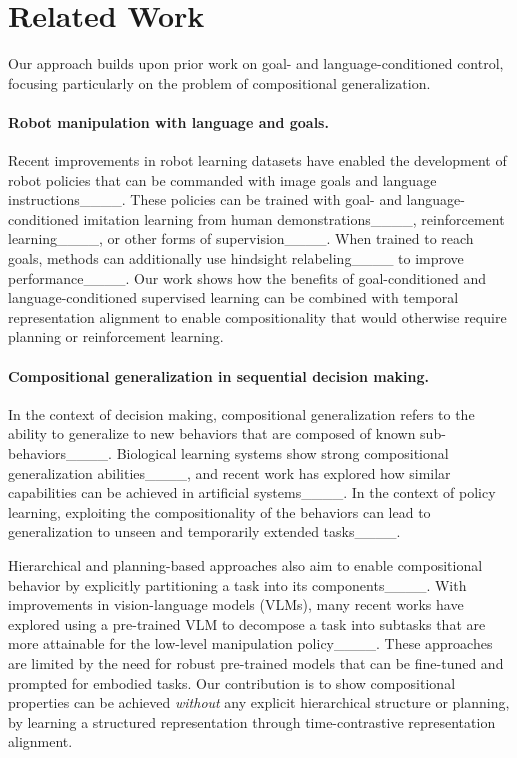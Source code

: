 \section{Related Work}
\label{sec:background}

Our approach builds upon prior work on goal- and language-conditioned control, focusing particularly on the problem of compositional generalization.

\paragraph{Robot manipulation with language and goals.}Recent improvements in robot learning datasets have enabled the development of robot policies that can be commanded with image goals and language instructions____.
These policies can be trained with goal- and language-conditioned imitation learning from human demonstrations____, reinforcement learning____, or other forms of supervision____.
When trained to reach goals, methods can additionally use hindsight relabeling____ to improve performance____.
Our work shows how the benefits of goal-conditioned and language-conditioned supervised learning can be combined with temporal representation alignment to enable compositionality that would otherwise require planning or reinforcement learning.

\paragraph{Compositional generalization in sequential decision making.}
In the context of decision making, compositional generalization refers to the ability to generalize to new behaviors that are composed of known sub-behaviors____.
Biological learning systems show strong compositional generalization abilities____, and recent work has explored how similar capabilities can be achieved in artificial systems____.
In the context of policy learning, exploiting the compositionality of the behaviors can lead to generalization to unseen and temporarily extended tasks____.

Hierarchical and planning-based approaches also aim to enable compositional behavior by explicitly partitioning a task into its components____.
With improvements in vision-language models (VLMs), many recent works have explored using a pre-trained VLM to decompose a task into subtasks that are more attainable for the low-level manipulation policy____.
These approaches are limited by the need for robust pre-trained models that can be fine-tuned and prompted for embodied tasks.
Our contribution is to show compositional properties can be achieved \textit{without} any explicit hierarchical structure or planning, by learning a structured representation through time-contrastive representation alignment.

